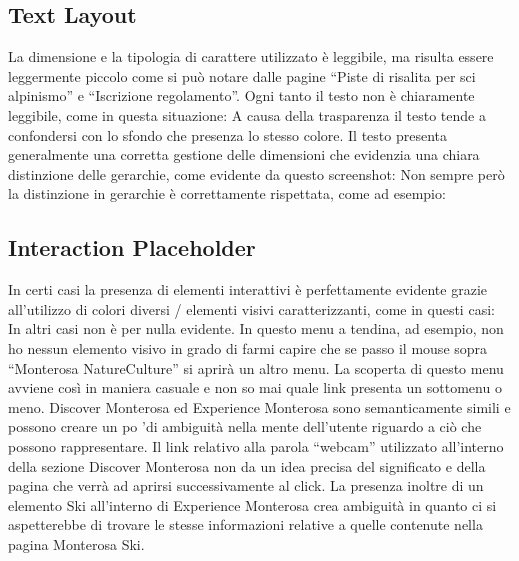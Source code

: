         \subsection{Text Layout}
        La dimensione e la tipologia di carattere utilizzato è leggibile, ma
        risulta essere leggermente piccolo come si può notare  dalle pagine
        “Piste di risalita per sci alpinismo” e “Iscrizione regolamento”.
        Ogni tanto il testo non è chiaramente leggibile, come in questa
        situazione:
        A causa della trasparenza il testo tende a confondersi con lo sfondo che
        presenza lo stesso colore. Il testo presenta generalmente una corretta gestione delle
        dimensioni che evidenzia una chiara distinzione delle gerarchie, come
        evidente da questo screenshot:
        Non sempre però la distinzione in gerarchie è correttamente rispettata, come ad esempio:
        \subsection{Interaction Placeholder}
        In certi casi la presenza di elementi interattivi è perfettamente
        evidente grazie all’utilizzo di colori diversi / elementi visivi
        caratterizzanti, come in questi casi:
        In altri casi non è per nulla evidente.
        In questo menu a tendina, ad esempio, non ho nessun elemento visivo in
        grado di farmi capire che se passo il mouse sopra “Monterosa NatureCulture” si
        aprirà un altro menu. La scoperta di questo menu avviene così in maniera casuale
        e non so mai quale link presenta un sottomenu o meno.
        Discover Monterosa ed Experience Monterosa sono semanticamente simili e
        possono creare un po 'di ambiguità nella mente dell'utente riguardo a
        ciò che possono rappresentare.
        Il link relativo alla parola “webcam” utilizzato all'interno della
        sezione Discover Monterosa non da un idea precisa del significato e
        della pagina che verrà ad aprirsi successivamente al click. La presenza
        inoltre di un elemento Ski all'interno di Experience Monterosa crea
        ambiguità in quanto ci si aspetterebbe di trovare le stesse informazioni
        relative a quelle contenute nella pagina Monterosa Ski.
